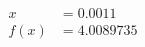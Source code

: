 \documentclass[preview]{standalone}
\begin{document}
\begin{align*}
x &= 0.0011\\f(x) &= 4.0089735
\end{align*}
\end{document}
